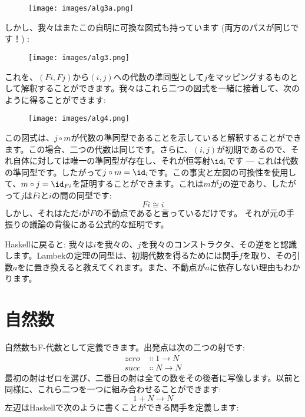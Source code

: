 \begin{figure}[H]
  \centering
  \texttt{[image: images/alg3a.png]}
\end{figure}

\noindent
しかし、我々はまたこの自明に可換な図式も持っています (両方のパスが同じです！) : 

\begin{figure}[H]
  \centering
  \texttt{[image: images/alg3.png]}
\end{figure}

\noindent
これを、$(F i, F j)$から$(i, j)$への代数の準同型として$j$をマッピングするものとして解釈することができます。我々はこれら二つの図式を一緒に接着して、次のように得ることができます: 

\begin{figure}[H]
  \centering
  \texttt{[image: images/alg4.png]}
\end{figure}

\noindent
この図式は、$j \circ m$が代数の準同型であることを示していると解釈することができます。この場合、二つの代数は同じです。さらに、$(i, j)$が初期であるので、それ自体に対しては唯一の準同型が存在し、それが恒等射$\id_i$です --- これは代数の準同型です。したがって$j \circ m = \id_i$です。この事実と左図の可換性を使用して、$m \circ j = \id_{Fi}$を証明することができます。これは$m$が$j$の逆であり、したがって$j$は$F i$と$i$の間の同型です: 
\[F i \cong i\]
しかし、それはただ$i$が$F$の不動点であると言っているだけです。
それが元の手振りの議論の背後にある公式的な証明です。

Haskellに戻ると: 我々は$i$を我々の、$j$を我々のコンストラクタ、その逆をと認識します。Lambekの定理の同型は、初期代数を得るためには関手$f$を取り、その引数$a$をに置き換えると教えてくれます。また、不動点が$a$に依存しない理由もわかります。

\section{自然数}

自然数もF-代数として定義できます。出発点は次の二つの射です: 
\begin{align*}
  zero & \Colon 1 \to N \\
  succ & \Colon N \to N
\end{align*}
最初の射はゼロを選び、二番目の射は全ての数をその後者に写像します。以前と同様に、これら二つを一つに組み合わせることができます: 
\[1 + N \to N\]
左辺はHaskellで次のように書くことができる関手を定義します: 

